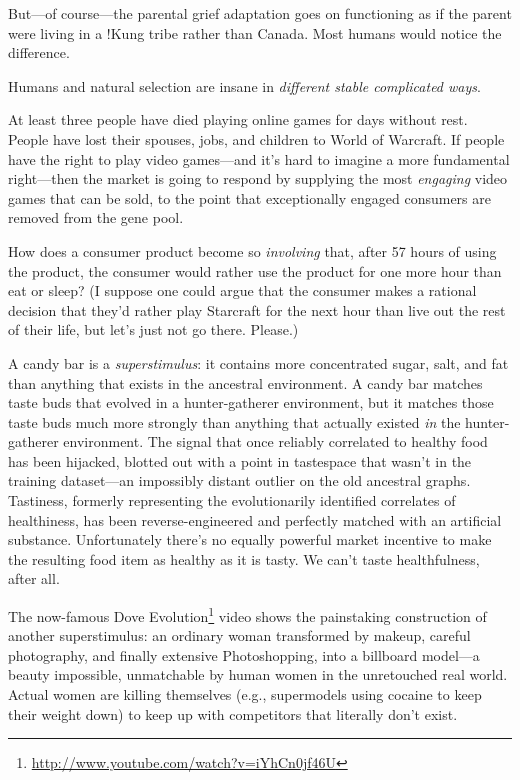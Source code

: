  But---of course---the parental grief adaptation goes on
functioning as if the parent were living in a !Kung tribe rather than
Canada. Most humans would notice the difference.

{
 Humans and natural selection are insane in \textit{different
stable complicated ways}.}

\myendsectiontext


\bigskip



 At least three people have died playing online games for days
without rest. People have lost their spouses, jobs, and children to
World of Warcraft. If people have the right to play video games---and
it's hard to imagine a more fundamental right---then
the market is going to respond by supplying the most \textit{engaging}
video games that can be sold, to the point that exceptionally engaged
consumers are removed from the gene pool. 


 How does a consumer product become so \textit{involving} that,
after 57 hours of using the product, the consumer would rather use the
product for one more hour than eat or sleep? (I suppose one could argue
that the consumer makes a rational decision that they'd
rather play Starcraft for the next hour than live out the rest of their
life, but let's just not go there. Please.)


 A candy bar is a \textit{superstimulus}: it contains more
concentrated sugar, salt, and fat than anything that exists in the
ancestral environment. A candy bar matches taste buds that evolved in a
hunter-gatherer environment, but it matches those taste buds much more
strongly than anything that actually existed \textit{in} the
hunter-gatherer environment. The signal that once reliably correlated
to healthy food has been hijacked, blotted out with a point in
tastespace that wasn't in the training dataset---an
impossibly distant outlier on the old ancestral graphs. Tastiness,
formerly representing the evolutionarily identified correlates of
healthiness, has been reverse-engineered and perfectly matched with an
artificial substance. Unfortunately there's no equally
powerful market incentive to make the resulting food item as healthy as
it is tasty. We can't taste healthfulness, after all.


 The now-famous Dove Evolution\footnote{\url{http://www.youtube.com/watch?v=iYhCn0jf46U}} video shows the painstaking
construction of another superstimulus: an ordinary woman transformed by
makeup, careful photography, and finally extensive Photoshopping, into
a billboard model---a beauty impossible, unmatchable by human women in
the unretouched real world. Actual women are killing themselves (e.g.,
supermodels using cocaine to keep their weight down) to keep up with
competitors that literally don't exist.



